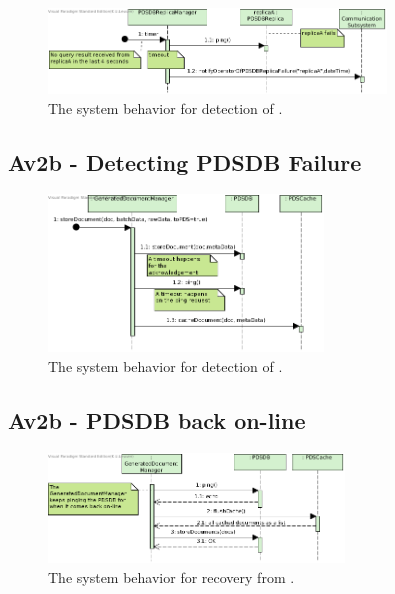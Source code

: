 \begin{figure}[!htp]
    \centering
    \includegraphics[width=0.8\textwidth]{figures/Av2 - PDSDBReplica fails.png}
    \caption{The system behavior for detection of .
        }\label{fig:seq_av2fail}
\end{figure}

\subsection{Av2b - Detecting PDSDB Failure}

\begin{figure}[!htp]
    \centering
    \includegraphics[width=0.65\textwidth]{figures/Av2b - Detecting PDSDB Failure.png}
    \caption{The system behavior for detection of .
        }\label{fig:seq_av2bfail}
\end{figure}

\subsection{Av2b - PDSDB back on-line}

\begin{figure}[!htp]
    \centering
    \includegraphics[width=0.7\textwidth]{figures/Av2b - PDSDB back on-line.png}
    \caption{The system behavior for recovery from .
        }\label{fig:seq_av2bonline}
\end{figure}


